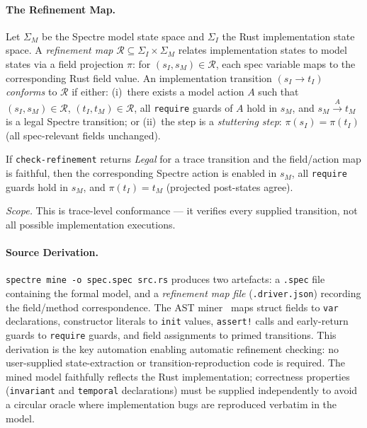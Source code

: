 \documentclass[runningheads]{llncs}
\begin{document}
\paragraph{The Refinement Map.}
Let $\Sigma_M$ be the Spectre model state space and $\Sigma_I$ the Rust
implementation state space.
A \emph{refinement map} $\mathcal{R} \subseteq \Sigma_I \times \Sigma_M$
relates implementation states to model states via a field projection $\pi$:
for $(s_I, s_M) \in \mathcal{R}$, each spec variable maps to the
corresponding Rust field value.
An implementation transition $(s_I \to t_I)$ \emph{conforms} to $\mathcal{R}$
if either: (i)~there exists a model action $A$ such that $(s_I,s_M)\in\mathcal{R}$,
$(t_I,t_M)\in\mathcal{R}$, all \texttt{require} guards of $A$ hold in $s_M$,
and $s_M \xrightarrow{A} t_M$ is a legal Spectre transition; or
(ii)~the step is a \emph{stuttering step}: $\pi(s_I) = \pi(t_I)$ (all
spec-relevant fields unchanged).

\begin{proposition}\label{prop:refine}
If \texttt{check-refinement} returns \emph{Legal} for a trace transition
and the field/action map is faithful, then the corresponding Spectre action
is enabled in $s_M$, all \texttt{require} guards hold in $s_M$, and
$\pi(t_I) = t_M$ (projected post-states agree).
\end{proposition}

\noindent\textit{Scope.}  This is trace-level conformance --- it verifies
every supplied transition, not all possible implementation executions.

\paragraph{Source Derivation.}
\texttt{spectre mine -o spec.spec src.rs} produces two artefacts: a
\texttt{.spec} file containing the formal model, and a \emph{refinement map
file} (\texttt{.driver.json}) recording the field/method correspondence.
The AST miner~\cite{syncratedoc} maps struct fields to \texttt{var}
declarations, constructor literals to \texttt{init} values,
\texttt{assert!} calls and early-return guards to \texttt{require} guards,
and field assignments to primed transitions.  This derivation is
the key automation enabling automatic refinement checking: no user-supplied
state-extraction or transition-reproduction code is required.
The mined model faithfully reflects the Rust implementation; correctness
properties (\texttt{invariant} and \texttt{temporal} declarations) must be
supplied independently to avoid a circular oracle where implementation bugs
are reproduced verbatim in the model.
\end{document}
